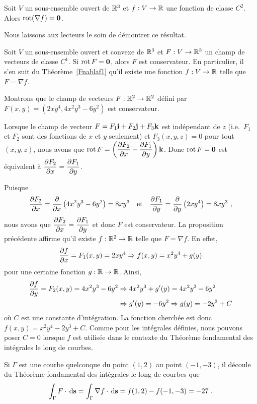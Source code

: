 {\begin{prop}
Soit $V$ un sous-ensemble ouvert de $\RR^3$ et $f:V\to \RR$ une
fonction de classe $C^2$.  Alors
$\curl(\nabla f) = \VEC{0}$.
\end{prop}

Nous laissons aux lecteurs le soin de démontrer ce résultat.

\begin{prop}
Soit $V$ un sous-ensemble ouvert et convexe de $\RR^3$ et
$F:V\to \RR^3$ un champ de vecteurs de classe $C^1$.  Si
$\curl F = \VEC{0}$, alors $F$ est conservateur.  En particulier, il
s'en suit du Théorème~\ref{Fnablaf1} qu'il existe une fonction
$f:V\to \RR$ telle que $F = \nabla f$.
\label{rotFzero}
\end{prop}

\begin{egg}
Montrons que le champ de vecteurs $F:\RR^2 \to \RR^2$ défini par
$F(x,y) = \left( 2 x y^4 , 4 x^2y^3 - 6 y^2\right)$ est conservateur.

Lorsque le champ de vecteur $F = F_1 \ii + F_2 \jj + F_3 \kk$ est
indépendant de $z$ (i.e.\ $F_1$ et $F_2$ sont des fonctions de $x$ et $y$
seulement) et $F_3(x,y,z) = 0$ pour tout $(x,y,z)$, nous avons que
$\displaystyle \curl F =
\left( \pdydx{F_2}{x} - \pdydx{F_1}{y}\right)\kk$.
Donc $\curl F = \VEC{0}$ est équivalent à
$\displaystyle \pdydx{F_2}{x} = \pdydx{F_1}{y}$.

Puisque
\[
\pdydx{F_2}{x} = \pdfdx{\left(4x^2 y^3 - 6 y^2\right)}{x} = 8x y^3
\quad \text{et} \quad
\pdydx{F_1}{y} = \pdfdx{\left(2 x y^4\right)}{y} = 8x y^3 \ ,
\]
nous avons que $\displaystyle \pdydx{F_2}{x} = \pdydx{F_1}{y}$ et donc
$F$ est conservateur.  La proposition précédente affirme qu'il existe
$f:\RR^2 \to \RR$ telle que $F = \nabla f$.  En effet,
\[
  \pdydx{f}{x} = F_1(x,y) = 2 x y^4 \Rightarrow f(x,y) = x^2 y^4 + g(y)
\]
pour une certaine fonction $g:\RR \to \RR$.  Ainsi,
\begin{align*}
\pdydx{f}{y} = F_2(x,y) = 4 x^2y^3 - 6 y^2 &\Rightarrow
4x^2y^3 + g'(y) = 4 x^2y^3 - 6 y^2 \\
& \Rightarrow  g'(y) = -6 y^2 \Rightarrow g(y) = -2 y^3 + C
\end{align*}
où $C$ est une constante d'intégration.  La fonction cherchée est donc
$f(x,y) = x^2 y^4 - 2 y^3 + C$.  Comme pour les intégrales
définies, nous pouvons poser $C=0$ lorsque $f$ est
utilisée dans le contexte du Théorème fondamental des intégrales le long
de courbes.

Si $\Gamma$ est une courbe quelconque du point $(1,2)$ au point
$(-1,-3)$, il découle du Théorème fondamental des intégrales le
long de courbes que
\[
  \int_{\Gamma} F \cdot \dx{\VEC{s}}
  = \int_{\Gamma} \nabla f \cdot \dx{\VEC{s}}
  = f(1,2)-f(-1,-3) =  -27 \ .
\]
\label{rotFzeroD2}
\end{egg}

}
